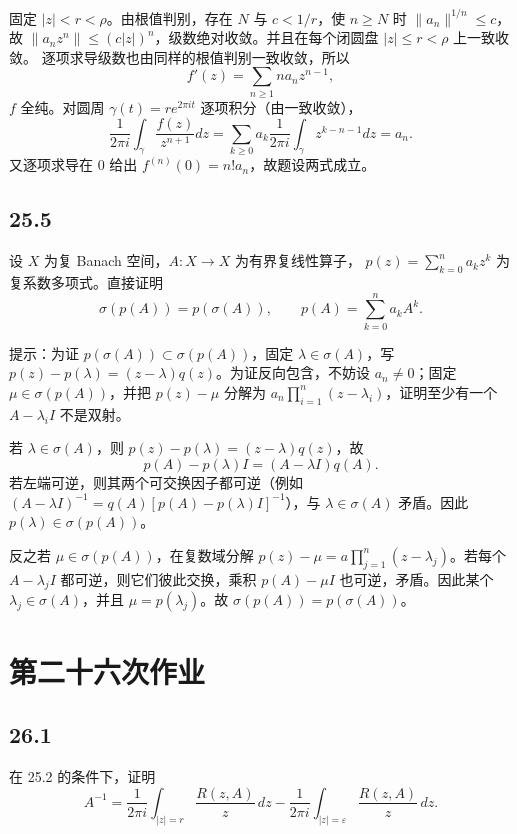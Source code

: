固定 $|z|<r<\rho$。由根值判别，存在 $N$ 与 $c<1/r$，使 $n\geq N$ 时
$\|a_n\|^{1/n}\leq c$，故
$\|a_nz^n\|\leq(c|z|)^n$，级数绝对收敛。并且在每个闭圆盘 $|z|\leq r<\rho$ 上一致收敛。
逐项求导级数也由同样的根值判别一致收敛，所以
\[
 f'(z)=\sum_{n\geq1}na_nz^{n-1},
\]
$f$ 全纯。对圆周 $\gamma(t)=re^{2\pi it}$ 逐项积分（由一致收敛），
\[
 \frac1{2\pi i}\int_\gamma\frac{f(z)}{z^{n+1}}dz
 =\sum_{k\geq0}a_k\frac1{2\pi i}\int_\gamma z^{k-n-1}dz=a_n.
\]
又逐项求导在 $0$ 给出 $f^{(n)}(0)=n!a_n$，故题设两式成立。

\subsection*{25.5}
\begin{problem}
设 $X$ 为复 Banach 空间，$A:X\to X$ 为有界复线性算子，
$p(z)=\sum_{k=0}^na_kz^k$ 为复系数多项式。直接证明
\[
 \sigma(p(A))=p(\sigma(A)),
 \qquad p(A)=\sum_{k=0}^na_kA^k.
\]

提示：为证 $p(\sigma(A))\subset\sigma(p(A))$，固定 $\lambda\in\sigma(A)$，写
$p(z)-p(\lambda)=(z-\lambda)q(z)$。为证反向包含，不妨设 $a_n\neq0$；固定
$\mu\in\sigma(p(A))$，并把 $p(z)-\mu$ 分解为
$a_n\prod_{i=1}^n(z-\lambda_i)$，证明至少有一个 $A-\lambda_iI$ 不是双射。
\end{problem}

若 $\lambda\in\sigma(A)$，则
$p(z)-p(\lambda)=(z-\lambda)q(z)$，故
\[
 p(A)-p(\lambda)I=(A-\lambda I)q(A).
\]
若左端可逆，则其两个可交换因子都可逆（例如
$(A-\lambda I)^{-1}=q(A)[p(A)-p(\lambda)I]^{-1}$），与
$\lambda\in\sigma(A)$ 矛盾。因此 $p(\lambda)\in\sigma(p(A))$。

反之若 $\mu\in\sigma(p(A))$，在复数域分解
$p(z)-\mu=a\prod_{j=1}^n(z-\lambda_j)$。若每个
$A-\lambda_jI$ 都可逆，则它们彼此交换，乘积
$p(A)-\mu I$ 也可逆，矛盾。因此某个 $\lambda_j\in\sigma(A)$，并且
$\mu=p(\lambda_j)$。故 $\sigma(p(A))=p(\sigma(A))$。

\section{第二十六次作业}

\subsection*{26.1}
\begin{problem}
在 25.2 的条件下，证明
\[
 A^{-1}=
 \frac1{2\pi i}\int_{|z|=r}\frac{R(z,A)}{z}\,dz
 -\frac1{2\pi i}\int_{|z|=\varepsilon}\frac{R(z,A)}{z}\,dz.
\]
\end{problem}

